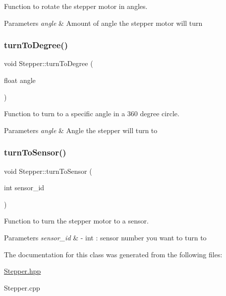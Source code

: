 Function to rotate the stepper motor in angles. 


\begin{DoxyParams}{Parameters}
{\em angle} & Amount of angle the stepper motor will turn \\
\hline
\end{DoxyParams}
\mbox{\label{class_stepper_a5fa54ffe303a6cc23d9a89920f648d68}} 
\subsubsection{\texorpdfstring{turn\+To\+Degree()}{turnToDegree()}}
{\footnotesize\ttfamily void Stepper\+::turn\+To\+Degree (\begin{DoxyParamCaption}\item[{float}]{angle }\end{DoxyParamCaption})}



Function to turn to a specific angle in a 360 degree circle. 


\begin{DoxyParams}{Parameters}
{\em angle} & Angle the stepper will turn to \\
\hline
\end{DoxyParams}
\mbox{\label{class_stepper_a9d6eeff6e62711bc18115d4a6a1d5ac2}} 
\subsubsection{\texorpdfstring{turn\+To\+Sensor()}{turnToSensor()}}
{\footnotesize\ttfamily void Stepper\+::turn\+To\+Sensor (\begin{DoxyParamCaption}\item[{int}]{sensor\+\_\+id }\end{DoxyParamCaption})}



Function to turn the stepper motor to a sensor. 


\begin{DoxyParams}{Parameters}
{\em sensor\+\_\+id} & -\/ int \+: sensor number you want to turn to \\
\hline
\end{DoxyParams}


The documentation for this class was generated from the following files\+:\begin{DoxyCompactItemize}
\item 
\hyperlink{_stepper_8hpp}{Stepper.\+hpp}\item 
Stepper.\+cpp\end{DoxyCompactItemize}
